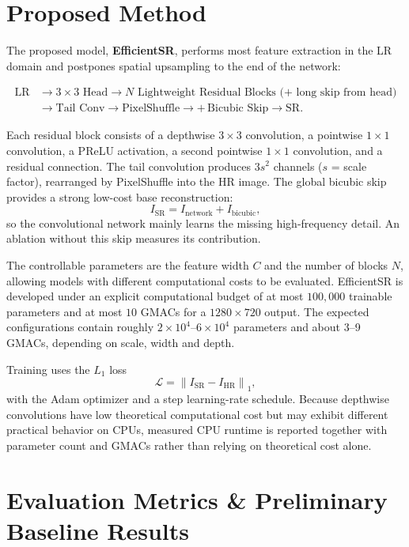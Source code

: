 \documentclass[11pt,a4paper]{article}
\begin{document}
\section{Proposed Method}
\label{sec:method}

The proposed model, \textbf{EfficientSR}, performs most feature extraction
in the LR domain and postpones spatial upsampling to the end of the network:

\begin{align*}
\text{LR}
&\rightarrow
3{\times}3\text{ Head}
\rightarrow
N\text{ Lightweight Residual Blocks (+ long skip from head)} \\
&\rightarrow
\text{Tail Conv}
\rightarrow
\text{PixelShuffle}
\rightarrow
+\,\text{Bicubic Skip}
\rightarrow
\text{SR}.
\end{align*}

Each residual block consists of a depthwise $3\times3$ convolution, a
pointwise $1\times1$ convolution, a PReLU activation, a second pointwise
$1\times1$ convolution, and a residual connection. The tail convolution
produces $3s^2$ channels ($s$ = scale factor), rearranged by PixelShuffle
into the HR image. The global bicubic skip provides a strong low-cost base
reconstruction:
\[
I_{\mathrm{SR}} = I_{\mathrm{network}} + I_{\mathrm{bicubic}},
\]
so the convolutional network mainly learns the missing high-frequency
detail. An ablation without this skip measures its contribution.

The controllable parameters are the feature width $C$ and the number of
blocks $N$, allowing models with different computational costs to be
evaluated. EfficientSR is developed under an explicit computational budget
of at most $100{,}000$ trainable parameters and at most $10$ GMACs for a
$1280\times720$ output. The expected configurations contain roughly
$2\times10^4$--$6\times10^4$ parameters and about 3--9 GMACs, depending on
scale, width and depth.

Training uses the $L_1$ loss
\[
\mathcal{L} = \left\| I_{\mathrm{SR}} - I_{\mathrm{HR}} \right\|_1,
\]
with the Adam optimizer and a step learning-rate schedule. Because
depthwise convolutions have low theoretical computational cost but may
exhibit different practical behavior on CPUs, measured CPU runtime is
reported together with parameter count and GMACs rather than relying on
theoretical cost alone.

\section{Evaluation Metrics \& Preliminary Baseline Results}
\label{sec:eval}
\end{document}
